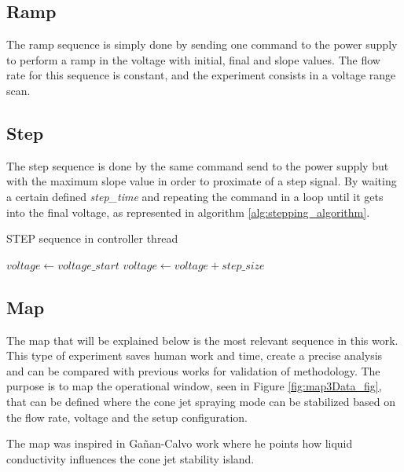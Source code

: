 \subsection{Ramp}

The ramp sequence is simply done by sending one command to the power supply to perform a ramp in the voltage with initial, final and slope values.
The flow rate for this sequence is constant, and the experiment consists in a voltage range scan.

\subsection{Step}
\label{subsec:step_routine}

The step sequence is done by the same command send to the power supply but with the maximum slope value in order to proximate of a step signal.
By waiting a certain defined \emph{step\_time} and repeating the command in a loop until it gets into the final voltage, as represented in algorithm \ref{alg:stepping_algorithm}.


\begin{algorithm}
    \caption{STEP sequence in controller thread}\label{alg:stepping_algorithm}
    \begin{algorithmic}
        \State $voltage \gets voltage\_start$
         
            \State {}
            \State {}
            \State $voltage \gets voltage + step\_size$
        \EndWhile
    \EndProcedure

    \end{algorithmic}
\end{algorithm}

\subsection{Map}

The map that will be explained below is the most relevant sequence in this work. This type of experiment saves human work and time, create a precise analysis and can be compared with previous works for validation of methodology.
The purpose is to map the operational window, seen in Figure \ref{fig:map3Data_fig}, that can be defined where the cone jet spraying mode can be stabilized based on the flow rate, voltage and the setup configuration.

The map was inspired in Gañan-Calvo\cite{gananCalvo} work where he points how liquid conductivity influences the cone jet stability island. 

